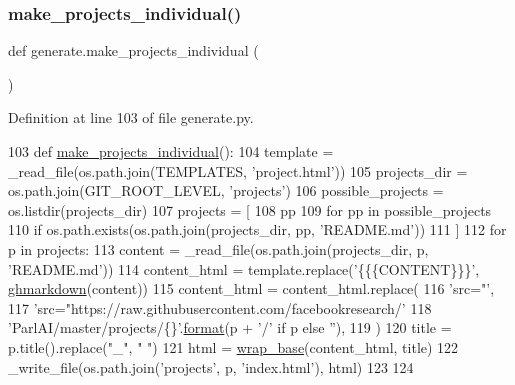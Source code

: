 \subsubsection{\texorpdfstring{make\+\_\+projects\+\_\+individual()}{make\_projects\_individual()}}
{\footnotesize\ttfamily def generate.\+make\+\_\+projects\+\_\+individual (\begin{DoxyParamCaption}{ }\end{DoxyParamCaption})}



Definition at line 103 of file generate.\+py.


\begin{DoxyCode}
103 \textcolor{keyword}{def }\hyperlink{namespacegenerate_a7e834fd25099e451f5809b35df4ef10d}{make\_projects\_individual}():
104     template = \_read\_file(os.path.join(TEMPLATES, \textcolor{stringliteral}{'project.html'}))
105     projects\_dir = os.path.join(GIT\_ROOT\_LEVEL, \textcolor{stringliteral}{'projects'})
106     possible\_projects = os.listdir(projects\_dir)
107     projects = [
108         pp
109         \textcolor{keywordflow}{for} pp \textcolor{keywordflow}{in} possible\_projects
110         \textcolor{keywordflow}{if} os.path.exists(os.path.join(projects\_dir, pp, \textcolor{stringliteral}{'README.md'}))
111     ]
112     \textcolor{keywordflow}{for} p \textcolor{keywordflow}{in} projects:
113         content = \_read\_file(os.path.join(projects\_dir, p, \textcolor{stringliteral}{'README.md'}))
114         content\_html = template.replace(\textcolor{stringliteral}{'\{\{\{CONTENT\}\}\}'}, \hyperlink{namespacegenerate_a7811fd26fa2e3aeec0e3d3851cdda546}{ghmarkdown}(content))
115         content\_html = content\_html.replace(
116             \textcolor{stringliteral}{'src="'},
117             \textcolor{stringliteral}{'src="https://raw.githubusercontent.com/facebookresearch/'}
118             \textcolor{stringliteral}{'ParlAI/master/projects/\{\}'}.\hyperlink{namespaceparlai_1_1chat__service_1_1services_1_1messenger_1_1shared__utils_a32e2e2022b824fbaf80c747160b52a76}{format}(p + \textcolor{stringliteral}{'/'} \textcolor{keywordflow}{if} p \textcolor{keywordflow}{else} \textcolor{stringliteral}{''}),
119         )
120         title = p.title().replace(\textcolor{stringliteral}{"\_"}, \textcolor{stringliteral}{" "})
121         html = \hyperlink{namespacegenerate_adb990cdb948e21150b35af85d236b6be}{wrap\_base}(content\_html, title)
122         \_write\_file(os.path.join(\textcolor{stringliteral}{'projects'}, p, \textcolor{stringliteral}{'index.html'}), html)
123 
124 
\end{DoxyCode}
\mbox{\label{namespacegenerate_a33f954414406a12534e313700841053e}} 
